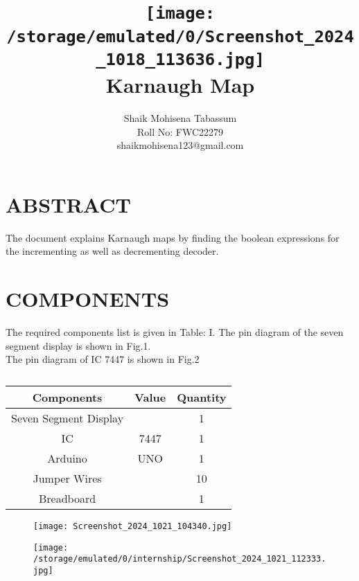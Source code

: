 \documentclass[conference]{IEEEtran}
\title{
\vspace{1cm}
{\texttt{[image: /storage/emulated/0/Screenshot\_2024\_1018\_113636.jpg]} \\ Karnaugh Map} }
\author{Shaik Mohisena Tabassum \\ Roll No: FWC22279 \\ shaikmohisena123@gmail.com}
\begin{document}
\maketitle
 \section {ABSTRACT}
 The document explains Karnaugh maps by finding the boolean expressions for the incrementing as well as decrementing decoder.
\section{COMPONENTS}
The required components list is given in Table: I. The pin diagram of the seven segment display is shown in Fig.1. \\
The pin diagram of IC 7447 is shown in Fig.2 
 \begin{table} [htbp]
\centering
\begin{tabular}{| c | c | c |} \hline
\textbf{Components} & \textbf{Value} & \textbf{Quantity} \\\hline
Seven Segment Display & & 1 \\ \hline
IC & 7447 & 1 \\ \hline 
Arduino & UNO & 1 \\ \hline
Jumper Wires &  & 10 \\ \hline
Breadboard & & 1 \\ 
\hline
\end{tabular}
\vspace{0.1cm}
\caption{\label{tab:widgets}}
\end{table}
\vspace {0.1cm}
\begin{figure}[h]                                
\centering                                       
\texttt{[image: Screenshot\_2024\_1021\_104340.jpg]}                            
\caption{\label{fig:Gates}}                    
\end{figure}

\begin{figure}[h]
\centering
\texttt{[image: /storage/emulated/0/internship/Screenshot\_2024\_1021\_112333.jpg]}
\caption{\label{fig:Gates}}
\end{figure}
\end{document}
